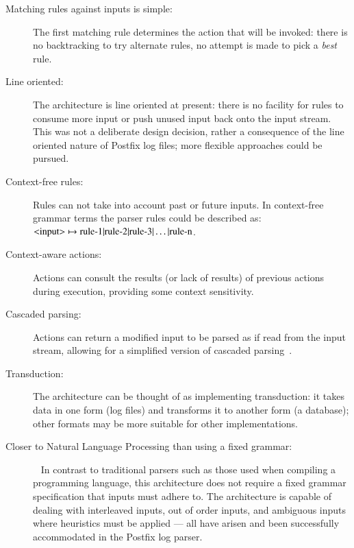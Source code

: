 \documentclass[preprint,draft,numbers,1p]{elsarticle}
\begin{document}
\begin{description}

    \item [Matching rules against inputs is simple:]  The first matching
        rule determines the action that will be invoked: there is no
        backtracking to try alternate rules, no attempt is made to pick a
        \textit{best\/} rule.

    \item [Line oriented:]  The architecture is line oriented at present:
        there is no facility for rules to consume more input or push unused
        input back onto the input stream.  This was not a deliberate design
        decision, rather a consequence of the line oriented nature of
        Postfix log files; more flexible approaches could be pursued.

    \item [Context-free rules:]  Rules can not take into account past or
        future inputs.  In context-free grammar terms the parser rules
        could be described as:
        \newline{}$\text{\textless{}input\textgreater{}} \mapsto
        \text{rule-1} | \text{rule-2} | \text{rule-3} | \dots |
        \text{rule-n}$.

    \item [Context-aware actions:] Actions can consult the results (or lack
        of results) of previous actions during execution, providing some
        context sensitivity.  
        
    \item [Cascaded parsing:] Actions can return a modified input to be
        parsed as if read from the input stream, allowing for a simplified
        version of cascaded parsing~\cite{cascaded-parsing}.

    \item [Transduction:]  The architecture can be thought of as
        implementing transduction: it takes data in one form (log files)
        and transforms it to another form (a database); other formats may
        be more suitable for other implementations.

    \item [Closer to Natural Language Processing than using a fixed
        grammar:] \empty{}~\newline{} In contrast to traditional parsers
        such as those used when compiling a programming language, this
        architecture does not require a fixed grammar specification that
        inputs must adhere to.  The architecture is capable of dealing with
        interleaved inputs, out of order inputs, and ambiguous inputs where
        heuristics must be applied --- all have arisen and been
        successfully accommodated in the Postfix log parser.

\end{description}
\end{document}
